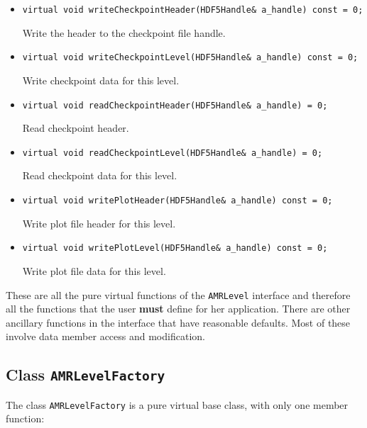 \begin{itemize}
\item
\begin{verbatim}
virtual void writeCheckpointHeader(HDF5Handle& a_handle) const = 0;
\end{verbatim}
Write the header to the checkpoint file handle.

\item
\begin{verbatim}
virtual void writeCheckpointLevel(HDF5Handle& a_handle) const = 0;
\end{verbatim}
Write checkpoint data for this level.
 
\item
\begin{verbatim}
virtual void readCheckpointHeader(HDF5Handle& a_handle) = 0;
\end{verbatim}
Read checkpoint header.

\item
\begin{verbatim}
virtual void readCheckpointLevel(HDF5Handle& a_handle) = 0;
\end{verbatim}
Read checkpoint data for this level.
 
\item
\begin{verbatim}
virtual void writePlotHeader(HDF5Handle& a_handle) const = 0;
\end{verbatim}
Write plot file header for this level.

\item
\begin{verbatim}
virtual void writePlotLevel(HDF5Handle& a_handle) const = 0;
\end{verbatim}
Write plot file data for this level.

\end{itemize}

These are all the pure virtual functions of the {\tt AMRLevel}
interface and therefore all the functions that the user {\bf must}
define for her application.  There are other ancillary functions in
the interface that have reasonable defaults.  Most of these involve
data member access and modification.

\subsection{Class {\tt AMRLevelFactory}}

The class {\tt AMRLevelFactory} is a pure virtual base class, with only
one member function:

